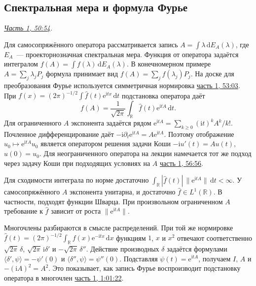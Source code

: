 \documentclass[11pt,a4paper]{article}
\theoremstyle{plain}
\theoremstyle{definition}
\newcommand{\RR}{\mathbb R}
\newcommand{\id}{I}
\newcommand{\dd}{\,\mathrm d}
\newcommand{\ii}{\mathrm i}
\newcommand{\ee}{\mathrm e}
\newcommand{\norm}[1]{\lVert#1\rVert}
\newcommand{\at}[3]{\href{https://www.youtube.com/watch?v=#1&t=#2s}{#3}}
\newcommand{\topic}[2]{\Needspace{5\baselineskip}\subsection*{#1}\noindent\emph{#2.}\par\nobreak\smallskip}
\begin{document}
\topic{Спектральная мера и формула Фурье}{\at{gP2CCEuVufo}{3054}{Часть 1, 50:54}}
Для самосопряжённого оператора рассматривается запись
$A=\int \lambda\dd E_A(\lambda)$, где $E_A$~---
проекторнозначная спектральная мера. Функция от оператора
задаётся интегралом $f(A)=\int f(\lambda)\dd E_A(\lambda)$.
В конечномерном примере
$A=\sum_j\lambda_j P_j$ формула принимает вид
$f(A)=\sum_j f(\lambda_j)P_j$. На доске для преобразования
Фурье используется симметричная нормировка
\at{gP2CCEuVufo}{3183}{часть 1, 53:03}. При
$f(x)=(2\pi)^{-1/2}\int \widehat f(t)\ee^{\ii tx}\dd t$
подстановка оператора даёт
\[
 f(A)=\frac{1}{\sqrt{2\pi}}\int_{\RR}\widehat f(t)\ee^{\ii tA}\dd t.
\]
Для ограниченного $A$ экспонента задаётся рядом
$\ee^{\ii tA}=\sum_{k\ge0}(\ii t)^k A^k/k!$.
Почленное дифференцирование даёт
$-\ii\partial_t\ee^{\ii tA}=A\ee^{\ii tA}$. Поэтому
отображение $u_0\mapsto\ee^{\ii tA}u_0$ является
оператором решения задачи Коши
$-\ii u'(t)=Au(t)$, $u(0)=u_0$. Для неограниченного
оператора на лекции намечается тот же подход через
задачу Коши при подходящих условиях на $A$
\at{gP2CCEuVufo}{3416}{часть 1, 56:56}.

Для сходимости интеграла по норме достаточно
$\int_{\RR}|\widehat f(t)|\,\norm{\ee^{\ii tA}}\dd t<\infty$.
У самосопряжённого $A$ экспонента унитарна, и достаточно
$\widehat f\in L^1(\RR)$. В частности, подходят функции
Шварца. При произвольном ограниченном $A$ требование к
$\widehat f$ зависит от роста $\norm{\ee^{\ii tA}}$.

Многочлены разбираются в смысле распределений. При той же
нормировке
$\widehat f(t)=(2\pi)^{-1/2}\int_{\RR} f(x)\ee^{-\ii tx}\dd x$
функциям $1$, $x$ и $x^2$ отвечают соответственно
$\sqrt{2\pi}\,\delta$, $\sqrt{2\pi}\,\ii\delta'$ и
$-\sqrt{2\pi}\,\delta''$.
Действие производных $\delta$ задаётся формулами
$\langle\delta',\psi\rangle=-\psi'(0)$ и
$\langle\delta'',\psi\rangle=\psi''(0)$. Подставляя
$\psi(t)=\ee^{\ii tA}$, получаем $\id$, $A$ и
$-(\ii A)^2=A^2$. Это показывает, как запись Фурье
воспроизводит подстановку оператора в многочлен
\at{gP2CCEuVufo}{3682}{часть 1, 1:01:22}.
\end{document}
